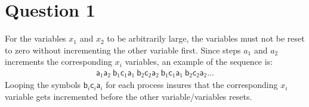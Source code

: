 \section*{Question 1}

For the variables $x_1$ and $x_2$ to be arbitrarily large, the variables must not be reset to zero without incrementing the other variable first. Since steps $a_1$ and $a_2$ increments the corresponding $x_i$ variables, an example of the sequence is:
\begin{gather*}
    \mathsf{a}_1\mathsf{a}_2 \: \mathsf{b}_1\mathsf{c}_1\mathsf{a}_1 \: \mathsf{b}_2\mathsf{c}_2\mathsf{a}_2 \: \mathsf{b}_1\mathsf{c}_1\mathsf{a}_1 \: \mathsf{b}_2\mathsf{c}_2\mathsf{a}_2 ...
\end{gather*}
Looping the symbols $\mathsf{b}_i \mathsf{c}_i \mathsf{a}_i$ for each process insures that the corresponding $x_i$ variable gets incremented before the other variable/variables resets. 
